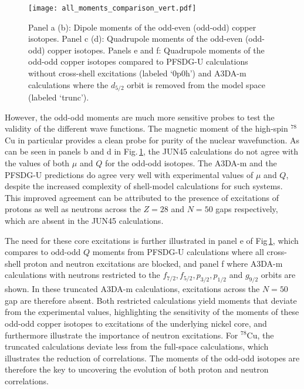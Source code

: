 \documentclass[reprint,superscriptaddress,amsmath,amssymb,aps,prl]{revtex4-1}
\begin{document}
\begin{figure}[ht!]
    \centering
    \texttt{[image: all\_moments\_comparison\_vert.pdf]}
    \caption{Panel a (b): Dipole moments of the odd-even (odd-odd) copper isotopes. Panel c (d): Quadrupole moments of the odd-even (odd-odd) copper isotopes. Panels e and f: Quadrupole moments of the odd-odd copper isotopes compared to PFSDG-U calculations without cross-shell excitations (labeled `0p0h') and A3DA-m calculations where the $d_{5/2}$ orbit is removed from the model space (labeled `trunc').} 
    \label{fig:all}
\end{figure}

However, the odd-odd moments are much more sensitive probes to test the validity of the different wave functions. The magnetic moment of the high-spin $^{78}$Cu in particular provides a clean probe for purity of the nuclear wavefunction. As can be seen in panels b and d in Fig.\,\ref{fig:all}, the JUN45 calculations do not agree with the values of both $\mu$ and $Q$ for the odd-odd isotopes. The A3DA-m and the PFSDG-U predictions do agree very well with experimental values of $\mu$ and $Q$, despite the increased complexity of shell-model calculations for such systems. This improved agreement can be attributed to the presence of excitations of protons as well as neutrons across the $Z=28$ and $N=50$ gaps respectively, which are absent in the JUN45 calculations.

The need for these core excitations is further illustrated in panel e of Fig\,\ref{fig:all}, which compares to odd-odd $Q$ moments from PFSDG-U calculations where all cross-shell proton and neutron excitations are blocked, and panel f where A3DA-m calculations with neutrons restricted to the $f_{7/2},f_{5/2},p_{3/2},p_{1/2}$ and $g_{9/2}$ orbits are shown. In these truncated A3DA-m calculations, excitations across the $N=50$ gap are therefore absent. Both restricted calculations yield moments that deviate from the experimental values, highlighting the sensitivity of the moments of these odd-odd copper isotopes to excitations of the underlying nickel core, and furthermore illustrate the importance of neutron excitations. For $^{78}$Cu, the truncated calculations deviate less from the full-space calculations, which illustrates the reduction of correlations. The moments of the odd-odd isotopes are therefore the key to uncovering the evolution of both proton and neutron correlations. 
\end{document}
